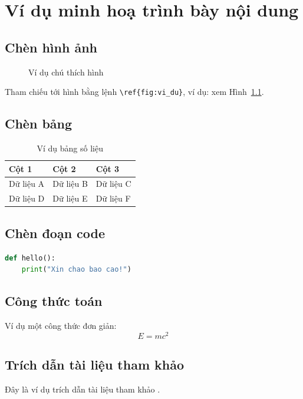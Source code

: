 \chapter{Ví dụ minh hoạ trình bày nội dung}
\label{ch:noi_dung_mau}


\section{Chèn hình ảnh}
\begin{figure}[H]
    \centering
    \caption{Ví dụ chú thích hình}
    \label{fig:vi_du}
\end{figure}

Tham chiếu tới hình bằng lệnh \texttt{\textbackslash ref\{fig:vi\_du\}}, ví dụ: xem Hình~\ref{fig:vi_du}.

\section{Chèn bảng}
\begin{table}[H]
\centering
\caption{Ví dụ bảng số liệu}
\label{tab:vi_du}
\begin{tabular}{lll}
\toprule
\textbf{Cột 1} & \textbf{Cột 2} & \textbf{Cột 3} \\
\midrule
Dữ liệu A & Dữ liệu B & Dữ liệu C \\
Dữ liệu D & Dữ liệu E & Dữ liệu F \\
\bottomrule
\end{tabular}
\end{table}

\section{Chèn đoạn code}
\begin{lstlisting}[language=Python, caption={Ví dụ đoạn code minh hoạ}]
def hello():
    print("Xin chao bao cao!")
\end{lstlisting}

\section{Công thức toán}
Ví dụ một công thức đơn giản:
\begin{equation}
    E = mc^2
    \label{eq:vi_du}
\end{equation}

\section{Trích dẫn tài liệu tham khảo}
Đây là ví dụ trích dẫn tài liệu tham khảo \cite{example2024}.
